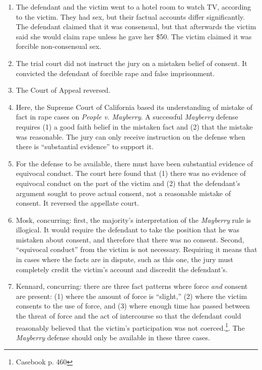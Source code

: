 \begin{enumerate}
    \item The defendant and the victim went to a hotel room to watch TV, 
    according to the victim. They had sex, but their factual accounts differ 
    significantly. The defendant claimed that it was consensual, but that 
    afterwards the victim said she would claim rape unless he gave her \$50. 
    The victim claimed it was forcible non-consensual sex.
    \item The trial court did not instruct the jury on a mistaken belief of 
    consent. It convicted the defendant of forcible rape and false 
    imprisonment.
    \item The Court of Appeal reversed.
    \item Here, the Supreme Court of California based its understanding of 
    mistake of fact in rape cases on \emph{People v. Mayberry}. A successful 
    \emph{Mayberry} defense requires (1) a good faith belief in the mistaken 
    fact and (2) that the mistake was reasonable. The jury can only receive 
    instruction on the defense when there is ``substantial evidence'' to 
    support it.
    \item For the defense to be available, there must have been substantial 
    evidence of equivocal conduct. The court here found that (1) there was no 
    evidence of equivocal conduct on the part of the victim and (2) that the 
    defendant's argument sought to prove actual consent, not a reasonable 
    mistake of consent. It reversed the appellate court.
    \item Mosk, concurring: first, the majority's interpretation of the 
    \emph{Mayberry} rule is illogical. It would require the defendant to take 
    the position that he was mistaken about consent, and therefore that there 
    was no consent. Second, ``equivocal conduct'' from the victim is not 
    necessary. Requiring it means that in cases where the facts are in 
    dispute, such as this one, the jury must completely credit the victim's 
    account and discredit the defendant's.
    \item Kennard, concurring: there are three fact patterns where force 
    \emph{and} consent are present: (1) where the amount of force is 
    ``slight,'' (2) where the victim consents to the use of force, and (3) 
    where enough time has passed between the threat of force and the act of 
    intercourse so that the defendant could reasonably believed that the 
    victim's participation was not coerced.\footnote{Casebook p. 460}. The 
    \emph{Mayberry} defense should only be available in these three cases.
\end{enumerate}


